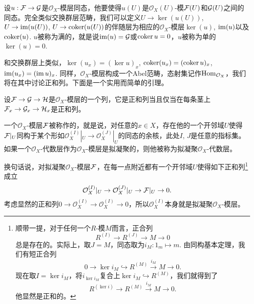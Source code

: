 


\begin{para}
设$u:\mathcal{F}\to \mathcal{G}$是$\mathcal{O}_X$-模层同态，他要使得$u(U)$是$\mathcal{O}_X(U)$-模$\mathcal{F}(U)$和$\mathcal{G}(U)$之间的同态。完全类似交换群层范畴，我们可以定义$U\to \ker(u(U))$, $U\to \operatorname{im}(u(U))$, $U\to \operatorname{coker}(u(U))$的伴随层为相应的$\mathcal{O}_X$-模层$\ker(u)$, $\operatorname{im}(u)$以及$\operatorname{coker}(u)$. $u$被称为满的，就是说$\operatorname{im}(u)=\mathcal{G}$或$\operatorname{coker} u=0$，$u$被称为单的$\ker(u)=0$. 
\end{para}

和交换群层上类似，$\ker(u_x)=(\ker u)_x$, $\operatorname{coker}(u_x)=(\operatorname{coker} u)_x$, $\operatorname{im}(u_x)=(\operatorname{im} u)_x$. 同样，$\mathcal{O}_X$-模层构成一个Abel范畴，态射集记作$\operatorname{Hom}_{\mathcal{O}_X}$，我们将在其中讨论正和列。下面是一个实用而简单的引理。

\begin{lem}
设$\mathcal{F}\to \mathcal{G} \to \mathcal{H}$是$\mathcal{O}_X$-模层的一个列，它是正和列当且仅当在每条茎上$\mathcal{F}_x\to\mathcal{G}_x\to \mathcal{H}_x$是正和列。
\end{lem}

\begin{para}[拟凝聚层]
一个$\mathcal{O}_X$-模层$\mathcal{F}$被称作的，就是说，对任意的$x\in X$，存在他的一个开邻域$U$使得$\mathcal{F}|_U$同构于某个形如$\mathcal{O}_X^{(I)}|_U\to \mathcal{O}_X^{(J)}|_U$的同态的余核，此处$I$, $J$是任意的指标集。如果一个$\mathcal{O}_X$-代数层作为$\mathcal{O}_X$-模层是拟凝聚的，则他被称为拟凝聚$\mathcal{O}_X$-代数层。

换句话说，对拟凝聚$\mathcal{O}_X$-模层$\mathcal{F}$，在每一点附近都有一个开邻域$U$使得如下正和列\footnote{顺带一提，对于任何一个$R$-模$M$而言，正合列
\[
	R^{(I)}\to R^{(J)}\to M\to 0
\]
总是存在的。实际上，取$J=M$，同态取为$i_M:1_m\mapsto m$. 由同构基本定理，我们有短正合列
\[
	0\to \ker i_M\hookrightarrow R^{(M)} \xrightarrow{i_M} M \to 0.
\]
现在取$I=\ker i_M$，将$i_{\ker i_M}$复合上$\ker i_M\hookrightarrow R^{(M)}$，我们就得到了
\[
	R^{(\ker i)}\to R^{(M)} \xrightarrow{i_M} M \to 0.
\]
他显然是正和的。}成立
\[
	\mathcal{O}_X^{(I)}|_U\to \mathcal{O}_X^{(J)}|_U\to \mathcal{F}|_U\to 0.
\]
考虑显然的正和列$0\to \mathcal{O}_X^{(I)}\to \mathcal{O}_X^{(I)} \to 0$，所以$\mathcal{O}_X^{(I)}$本身就是拟凝聚$\mathcal{O}_X$-模层。
\end{para}

